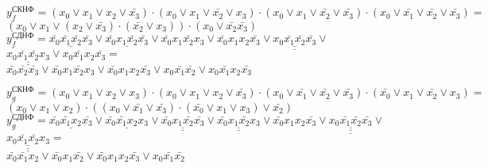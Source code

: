 \documentclass{bmstu}
\begin{document}
	\begin{center}
	   $y^{\text{СКНФ}}_f = (x_0 \vee x_1 \vee x_2 \vee \bar{x_3}) \cdot 
							(x_0 \vee x_1 \vee \bar{x_2} \vee x_3) \cdot 
							(x_0 \vee x_1 \vee \bar{x_2} \vee \bar{x_3}) \cdot 
							(x_0 \vee \bar{x_1} \vee \bar{x_2} \vee \bar{x_3}) = $ \\
	   $(x_0 \vee x_1 \vee (x_2 \vee \bar{x_3}) \cdot (\bar{x_2} \vee x_3)) \cdot
	    (x_0 \vee \bar{x_2} \bar{x_3})$ \\
	   $y^{\text{СДНФ}}_f = \underline{\bar{x_0} \bar{x_1} \bar{x_2} \bar{x_3}} \vee
							\underline{\bar{x_0} x_1 \bar{x_2} \bar{x_3}} \vee 
							\bar{x_0} x_1 \bar{x_2} x_3 \vee
							\bar{x_0} x_1 x_2 \bar{x_3} \vee 
							\underline{\underline{x_0 \bar{x_1} \bar{x_2} \bar{x_3}}} \vee $
							$\underline{\underline{x_0 \bar{x_1} \bar{x_2} x_3}} \vee 
							x_0 \bar{x_1} x_2 \bar{x_3} = $ \\
	   $\bar{x_0} \bar{x_2} \bar{x_3} \vee 
	    \bar{x_0} x_1 \bar{x_2} x_3 \vee
	    \bar{x_0} x_1 x_2 \bar{x_3} \vee
	    x_0 \bar{x_1} \bar{x_2} \vee
	    x_0 \bar{x_1} x_2 \bar{x_3} $
	\end{center}


	\begin{center}
       $y^{\text{СКНФ}}_g = (x_0 \vee x_1 \vee x_2 \vee x_3) \cdot 
							(x_0 \vee x_1 \vee x_2 \vee \bar{x_3}) \cdot 
							(x_0 \vee \bar{x_1} \vee \bar{x_2} \vee \bar{x_3}) \cdot 
							(\bar{x_0} \vee x_1 \vee \bar{x_2} \vee x_3) = $ \\
	   $(x_0 \vee x_1 \vee x_2) \cdot
	    ((x_0 \vee \bar{x_1} \vee \bar{x_3}) \cdot (\bar{x_0} \vee x_1 \vee x_3) \vee \bar{x_2})$ \\		            
	   $y^{\text{СДНФ}}_g = \underline{\bar{x_0} \bar{x_1} x_2 \bar{x_3}} \vee
							\underline{\bar{x_0} \bar{x_1} x_2 x_3} \vee 
							\underline{\underline{\bar{x_0} x_1 \bar{x_2} \bar{x_3}}} \vee
							\underline{\underline{\bar{x_0} x_1 \bar{x_2} x_3}} \vee 
							\bar{x_0} x_1 x_2 \bar{x_3} \vee 
							\underline{\underline{\underline{x_0 \bar{x_1} \bar{x_2} \bar{x_3}}}} \vee$ 
							$\underline{\underline{\underline{x_0 \bar{x_1} \bar{x_2} x_3}}} = $ \\
	   $\bar{x_0} \bar{x_1} x_2 \vee
	    \bar{x_0} x_1 \bar{x_2} \vee
	    \bar{x_0} x_1 x_2 \bar{x_3} \vee
	    x_0 \bar{x_1} \bar{x_2}$
	\end{center}


\end{document}
